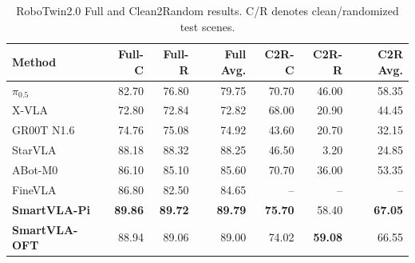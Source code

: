 \begin{table}[!htb]
\centering
\setlength{\abovecaptionskip}{0pt}
\setlength{\belowcaptionskip}{\baselineskip}
\caption{RoboTwin2.0 Full and Clean2Random results. C/R denotes clean/randomized test scenes.}
\label{tab:robotwin}
\normalsize
\setlength{\tabcolsep}{2.4pt}
\begin{tabular}{@{}lrrrrrr@{}}
\toprule
Method & Full-C & Full-R & Full Avg. & C2R-C & C2R-R & C2R Avg. \\
\midrule
$\pi_{0.5}$ & 82.70 & 76.80 & 79.75 & 70.70 & 46.00 & 58.35 \\
X-VLA & 72.80 & 72.84 & 72.82 & 68.00 & 20.90 & 44.45 \\
GR00T N1.6 & 74.76 & 75.08 & 74.92 & 43.60 & 20.70 & 32.15 \\
StarVLA & 88.18 & 88.32 & 88.25 & 46.50 & 3.20 & 24.85 \\
ABot-M0 & 86.10 & 85.10 & 85.60 & 70.70 & 36.00 & 53.35 \\
FineVLA & 86.80 & 82.50 & 84.65 & -- & -- & -- \\
\midrule
\rowcolor{smartvlarow}
\textbf{SmartVLA-Pi} & \textbf{89.86} & \textbf{89.72} & \textbf{89.79} & \textbf{75.70} & 58.40 & \textbf{67.05} \\
\rowcolor{smartvlarow}
\textbf{SmartVLA-OFT} & 88.94 & 89.06 & 89.00 & 74.02 & \textbf{59.08} & 66.55 \\
\bottomrule
\end{tabular}
\end{table}
